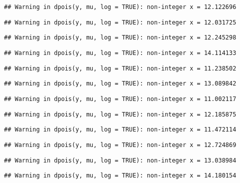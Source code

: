 \documentclass[
]{article}
\begin{document}
\begin{verbatim}
## Warning in dpois(y, mu, log = TRUE): non-integer x = 12.122696
\end{verbatim}

\begin{verbatim}
## Warning in dpois(y, mu, log = TRUE): non-integer x = 12.031725
\end{verbatim}

\begin{verbatim}
## Warning in dpois(y, mu, log = TRUE): non-integer x = 12.245298
\end{verbatim}

\begin{verbatim}
## Warning in dpois(y, mu, log = TRUE): non-integer x = 14.114133
\end{verbatim}

\begin{verbatim}
## Warning in dpois(y, mu, log = TRUE): non-integer x = 11.238502
\end{verbatim}

\begin{verbatim}
## Warning in dpois(y, mu, log = TRUE): non-integer x = 13.089842
\end{verbatim}

\begin{verbatim}
## Warning in dpois(y, mu, log = TRUE): non-integer x = 11.002117
\end{verbatim}

\begin{verbatim}
## Warning in dpois(y, mu, log = TRUE): non-integer x = 12.185875
\end{verbatim}

\begin{verbatim}
## Warning in dpois(y, mu, log = TRUE): non-integer x = 11.472114
\end{verbatim}

\begin{verbatim}
## Warning in dpois(y, mu, log = TRUE): non-integer x = 12.724869
\end{verbatim}

\begin{verbatim}
## Warning in dpois(y, mu, log = TRUE): non-integer x = 13.038984
\end{verbatim}

\begin{verbatim}
## Warning in dpois(y, mu, log = TRUE): non-integer x = 14.180154
\end{verbatim}
\end{document}
